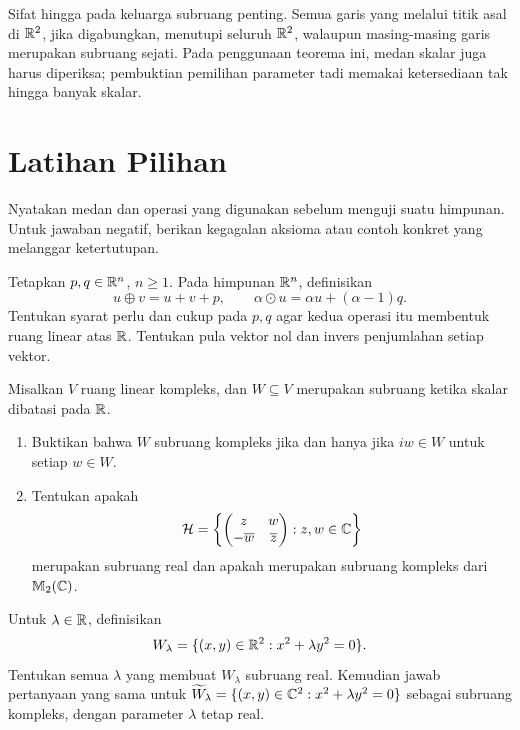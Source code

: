 Sifat hingga pada keluarga subruang penting. Semua garis yang
melalui titik asal di $\mathbb{R}^2$, jika digabungkan, menutupi seluruh
$\mathbb{R}^2$, walaupun masing-masing garis merupakan subruang sejati.
Pada penggunaan teorema ini, medan skalar juga harus diperiksa;
pembuktian pemilihan parameter tadi memakai ketersediaan tak
hingga banyak skalar.

\section{Latihan Pilihan}
\label{linear:latihan}

Nyatakan medan dan operasi yang digunakan sebelum menguji suatu
himpunan. Untuk jawaban negatif, berikan kegagalan aksioma atau
contoh konkret yang melanggar ketertutupan.

\begin{latihan}\label{linear:lat-operasi}
    Tetapkan $p,q\in\mathbb{R}^n$, $n\ge1$. Pada himpunan $\mathbb{R}^n$, definisikan
    \[
        u\oplus v=u+v+p,\qquad
        \alpha\odot u=\alpha u+(\alpha-1)q.
    \]
    Tentukan syarat perlu dan cukup pada $p,q$ agar kedua operasi
    itu membentuk ruang linear atas $\mathbb{R}$. Tentukan pula vektor nol
    dan invers penjumlahan setiap vektor.
\end{latihan}

\begin{latihan}\label{linear:lat-kompleks}
    Misalkan $V$ ruang linear kompleks, dan $W\subseteq V$
    merupakan subruang ketika skalar dibatasi pada $\mathbb{R}$.
    \begin{enumerate}[label=(\alph*),nosep]
        \item Buktikan bahwa $W$ subruang kompleks jika dan hanya
              jika $iw\in W$ untuk setiap $w\in W$.
        \item Tentukan apakah
              \[
                  \mathcal H=\left\{
                  \begin{pmatrix}z&w\\-\overline w&\overline z\end{pmatrix}
                  :z,w\in\mathbb{C}\right\}
              \]
              merupakan subruang real dan apakah merupakan subruang
              kompleks dari $\mathbb{M}_2(\mathbb{C})$.
    \end{enumerate}
\end{latihan}

\begin{latihan}\label{linear:lat-kuadratik}
    Untuk $\lambda\in\mathbb{R}$, definisikan
    \[
        W_\lambda=\{(x,y)\in\mathbb{R}^2:x^2+\lambda y^2=0\}.
    \]
    Tentukan semua $\lambda$ yang membuat $W_\lambda$ subruang real.
    Kemudian jawab pertanyaan yang sama untuk
    $\widetilde W_\lambda=\{(x,y)\in\mathbb{C}^2:x^2+\lambda y^2=0\}$
    sebagai subruang kompleks, dengan parameter $\lambda$ tetap real.
\end{latihan}

